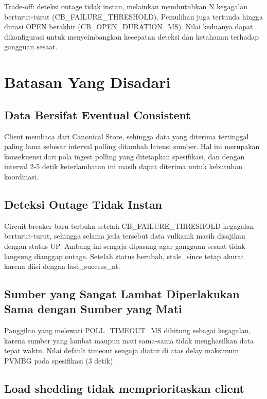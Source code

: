 Trade-off: deteksi outage tidak instan, melainkan membutuhkan N kegagalan berturut-turut (CB\_FAILURE\_\allowbreak THRESHOLD). Pemulihan juga tertunda hingga durasi OPEN berakhir (CB\_OPEN\_\allowbreak DURATION\_MS). Nilai keduanya dapat dikonfigurasi untuk menyeimbangkan kecepatan deteksi dan ketahanan terhadap gangguan sesaat.

\section{Batasan Yang Disadari}

\subsection{Data Bersifat Eventual Consistent}

Client membaca dari Canonical Store, sehingga data yang diterima tertinggal paling lama sebesar interval polling ditambah latensi sumber. Hal ini merupakan konsekuensi dari pola ingest polling yang ditetapkan spesifikasi, dan dengan interval 2-5 detik keterlambatan ini masih dapat diterima untuk kebutuhan koordinasi.

\subsection{Deteksi Outage Tidak Instan}

Circuit breaker baru terbuka setelah CB\_FAILURE\_THRESHOLD kegagalan berturut-turut, sehingga selama jeda tersebut data vulkanik masih disajikan dengan status UP. Ambang ini sengaja dipasang agar gangguan sesaat tidak langsung dianggap outage. Setelah status berubah, stale\_since tetap akurat karena diisi dengan last\_success\_at.

\subsection{Sumber yang Sangat Lambat Diperlakukan Sama dengan Sumber yang Mati}

Panggilan yang melewati POLL\_TIMEOUT\_MS dihitung sebagai kegagalan, karena sumber yang lambat maupun mati sama-sama tidak menghasilkan data tepat waktu. Nilai default timeout sengaja diatur di atas delay maksimum PVMBG pada spesifikasi (3 detik).

\subsection{Load shedding tidak memprioritaskan client}

